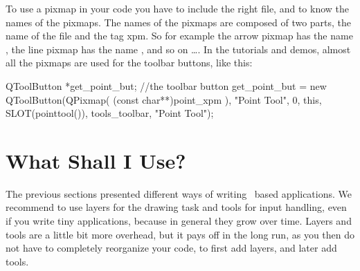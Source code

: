 











To use a pixmap in your code you have to include the right file, and
to know the names of the pixmaps. The names of the pixmaps are
composed of two parts, the name of the file and the tag xpm. So for
example the arrow pixmap has the name , the line
pixmap has the name , and so on \ldots.  In the
tutorials and demos, almost all the pixmaps are used for the toolbar
buttons, like this:

\ccExample
\begin{ccExampleCode}
    QToolButton *get_point_but; //the toolbar button
    get_point_but =  new QToolButton(QPixmap( (const char**)point_xpm ),
                                     "Point Tool", 
                                     0, 
                                     this, 
                                     SLOT(pointtool()), 
                                     tools_toolbar, 
                                     "Point Tool");
\end{ccExampleCode}



\section{What Shall I Use?}

The previous sections presented different ways of writing \qt\ based 
applications. We recommend to use layers for the drawing task and tools
for input handling, even if you write tiny applications, because in general
they grow over time.   Layers and tools are a little bit more overhead, but 
it pays off in the long run, as you then do not have to completely
reorganize your code, to first add layers, and later add tools. 



